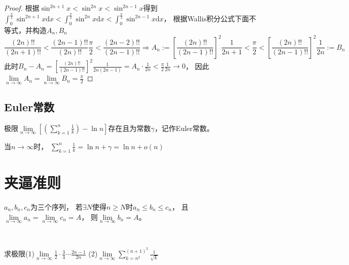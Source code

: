 \begin{proof}
  根据$\sin^{2n+1}x < \sin^{2n}x < \sin^{2n-1}x$得到$\int_0^{\frac{\pi}{2}}\sin^{2n+1}x \mathrm{d}x < \int_0^{\frac{\pi}{2}} \sin^{2n}x \mathrm{d}x < \int_0^{\frac{\pi}{2}} \sin^{2n-1}x \mathrm{d} x$，
  根据Wallis积分公式下面不等式，并构造$A_n,B_n$
  \begin{equation*}
    \frac{(2n)!!}{(2n+1)!!} < \frac{(2n-1)!!}{(2n)!!}\frac{\pi}{2} < \frac{(2n-2)!!}{(2n-1)!!} \Rightarrow
    A_n := \left[ \frac{(2n)!!}{(2n-1)!!} \right]^2 \frac{1}{2n+1} < \frac{\pi}{2} < \left[ \frac{(2n)!!}{(2n-1)!!} \right]^2 \frac{1}{2n} := B_n
  \end{equation*}
  此时$B_n - A_n = \left[ \frac{(2n)!!}{(2n-1)!!} \right]^2 \frac{1}{2n(2n - 1)} = A_n \cdot \frac{1}{2n} < \frac{\pi}{2}\frac{1}{2n} \rightarrow 0$，
  因此$\lim \limits _{n \rightarrow \infty} A_n = \lim \limits _{n \rightarrow \infty} B_n = \frac{\pi}{2}$
\end{proof}

\subsection{Euler常数}

\begin{theorem}[Euler常数]
  极限$\lim \limits _{n \rightarrow \infty} \left[ \left( \sum\limits_{k = 1}^n \frac{1}{k} \right) - \ln n \right]$存在且为常数$\gamma$，记作Euler常数。
\end{theorem}

\begin{corollary}[Euler常数的应用]
  当$n \rightarrow \infty$时，
  $\sum\limits_{k = 1}^n \frac{1}{k} = \ln n + \gamma = \ln n + o(n)$
\end{corollary}

\section{夹逼准则}

\begin{theorem}[夹逼准则]
  $a_n,b_n,c_n$为三个序列，
  若$\exists N$使得$n \geq N$时$a_n \leq b_n \leq c_n$，
  且$\lim \limits _{n \rightarrow \infty}  a_n = \lim \limits _{n \rightarrow \infty} c_n = A$，
  则$\lim \limits _{n \rightarrow \infty} b_n = A$。
\end{theorem}

~

\begin{exercise}[两道经典夹逼准则]
  求极限(1)$\lim \limits _{n \rightarrow \infty} \frac{1}{2} \cdot \frac{3}{4} \cdots \frac{2n-1}{2n}$
  (2)$\lim \limits _{n \rightarrow \infty} \sum\limits_{k = n^2}^{(n+1)^2} \frac{1}{\sqrt{k}}$
\end{exercise}

